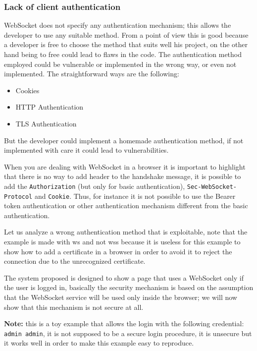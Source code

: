 	\subsubsection{Lack of client authentication}
	WebSocket does not specify any authentication mechanism; this allows the developer to use any suitable method.
	From a point of view this is good because a developer is free to choose the method that suits well his project, on the other hand being to free could lead to flaws in the code.\newline
	The authentication method employed could be vulnerable or implemented in the wrong way, or even not implemented.\newline
	The straightforward ways are the following:
	\begin{itemize}
		\item Cookies
		\item HTTP Authentication
		\item TLS Authentication
	\end{itemize}

	But the developer could implement a homemade authentication method, if not implemented with care it could lead to vulnerabilities.\newline
	
	When you are dealing with WebSocket in a browser it is important to highlight that there is no way to add header to the handshake message, it is possible to add the \texttt{Authorization} (but only for basic authentication), \texttt{Sec-WebSocket-Protocol} and \texttt{Cookie}.\newline
	Thus, for instance it is not possible to use the Bearer token authentication or other authentication mechanism different from the basic authentication.\newline
	
	Let us analyze a wrong authentication method that is exploitable, note that the example is made with ws and not wss because it is useless for this example to show how to add a certificate in a browser in order to avoid it to reject the connection due to the unrecognized certificate.\newline
	
	The system proposed is designed to show a page that uses a WebSocket only if the user is logged in, basically the security mechanism is based on the assumption that the WebSocket service will be used only inside the browser; we will now show that this mechanism is not secure at all.
	
	\textbf{Note:} this is a toy example that allows the login with the following credential: \texttt{admin admin}, it is not supposed to be a secure login procedure, it is unsecure but it works well in order to make this example easy to reproduce.
	
